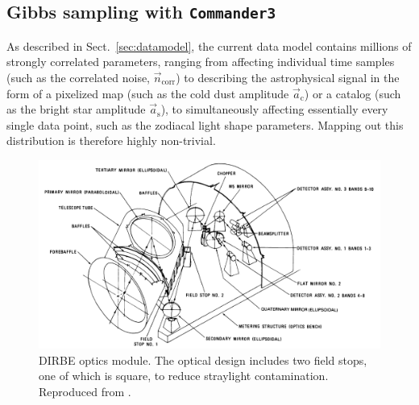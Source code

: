 \documentclass{aa}
\def\commanderthree{\texttt{Commander3}}
\newcommand{\n}[0]{\vec{n}}
\renewcommand{\a}[0]{\vec{a}}
\begin{document}
\subsection{Gibbs sampling with \commanderthree}

As described in Sect.~\ref{sec:datamodel}, the current data model
contains millions of strongly correlated parameters, ranging from
affecting individual time samples (such as the correlated noise,
$\n_{\mathrm{corr}}$) to describing the astrophysical signal in the
form of a pixelized map (such as the cold dust amplitude
$\a_{\mathrm{c}}$) or a catalog (such as the bright star amplitude
$\a_{\mathrm{s}}$), to simultaneously affecting essentially every
single data point, such as the zodiacal light shape
parameters. Mapping out this distribution is therefore highly
non-trivial.

\begin{figure}
	\centering
	\includegraphics[width=\linewidth]{figs/DIRBE_optics.png}
	\caption{DIRBE optics module. The optical design includes two field stops, one of which is square, to reduce straylight contamination. Reproduced from \cite{magner87}.
	}
	\label{fig:optics_model}
\end{figure}
\end{document}
